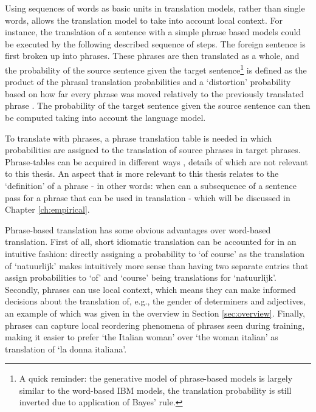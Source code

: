 \documentclass{report}
\theoremstyle{break}
\begin{document}
Using sequences of words as basic units in translation models, rather than single words, allows the translation model to take into account local context. For instance, the translation of a sentence with a simple phrase based models could be executed by the following described sequence of steps. The foreign sentence is first broken up into phrases. These phrases are then translated as a whole, and the probability of the source sentence given the target sentence\footnote{A quick reminder: the generative model of phrase-based models is largely similar to the word-based IBM models, the translation probability is still inverted due to application of Bayes' rule.} is defined as the product of the phrasal translation probabilities and a `distortion' probability based on how far every phrase was moved relatively to the previously translated phrase \citep{koehn2003statistical}. The probability of the target sentence given the source sentence can then be computed taking into account the language model.

To translate with phrases, a phrase translation table is needed in which probabilities are assigned to the translation of source phrases in target phrases. Phrase-tables can be acquired in different ways \citep{marcu2002phrase,och1999improved,koehn2003statistical,mylonakis_simaan_emnlp_2008}, details of which are not relevant to this thesis. An aspect that is more relevant to this thesis relates to the `definition' of a phrase -  in other words: when can a subsequence of a sentence pass for a phrase that can be used in translation - which will be discussed in Chapter \ref{ch:empirical}.

Phrase-based translation has some obvious advantages over word-based translation. First of all, short idiomatic translation can be accounted for in an intuitive fashion: directly assigning a probability to `of course' as the translation of `natuurlijk' makes intuitively more sense than having two separate entries that assign probabilities to `of' and `course' being translations for `natuurlijk'. Secondly, phrases can use local context, which means they can make informed decisions about the translation of, e.g., the gender of determiners and adjectives, an example of which was given in the overview in Section \ref{sec:overview}. Finally, phrases can capture local reordering phenomena of phrases seen during training, making it easier to prefer `the Italian woman' over `the woman italian' as translation of `la donna italiana'.
\end{document}
